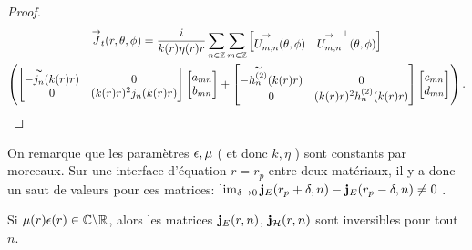 \begin{proof}
\begin{multline*}
            {\overset{\rightarrow}{J}}_t(r,\theta,\phi) = \dfrac{i}{k(r)\eta(r)r}\sum_{n\in\mathbb Z}\sum_{m\in\mathbb Z}
            \begin{bmatrix}
                {\overset{\rightarrow}{U_{m,n}^{{}}}}(\theta,\phi) & {\overset{\rightarrow}{U_{m,n}^{{}}}}^\perp(\theta,\phi)
            \end{bmatrix}
            \\
            \left(
                \begin{bmatrix}
                    -\overset{\thicksim}{j_n}(k(r)r) & 0
                    \\
                    0 & (k(r)r)^2 j_n(k(r)r)
                \end{bmatrix}
                \begin{bmatrix}
                    a_{mn}
                    \\
                    b_{mn}
                \end{bmatrix}
                +
                \begin{bmatrix}
                    -\overset{\thicksim}{h^{(2)}_n}(k(r)r) & 0
                    \\                
                    0 & (k(r)r)^2 h^{(2)}_n(k(r)r)
                \end{bmatrix}
                \begin{bmatrix}
                    c_{mn}
                    \\
                    d_{mn}
                \end{bmatrix}
            \right).
        \end{multline*}
    \end{proof}

    On remarque que les paramètres \(\epsilon,\mu\) ( et donc \(k,\eta\) ) sont constants par morceaux.
    Sur une interface d'équation \(r=r_p\) entre deux matériaux, il y a donc un saut de valeurs pour ces matrices: \(\lim_{\delta\rightarrow 0 } \mathbf{j}_E(r_p+ \delta,n) - \mathbf{j}_E(r_p - \delta,n) \not = 0\) .

    \begin{prop}
        \label{lem:sphere:imp:inv_matrices_JE-HE}
        Si \(\mu(r)\epsilon(r) \in \mathbb C\backslash\mathbb R\), alors les matrices \(\mathbf{j}_E(r,n)\), \(\mathbf{j}_{\mathcal{H}}(r,n)\)  sont inversibles pour tout \(n\).
    \end{prop}

